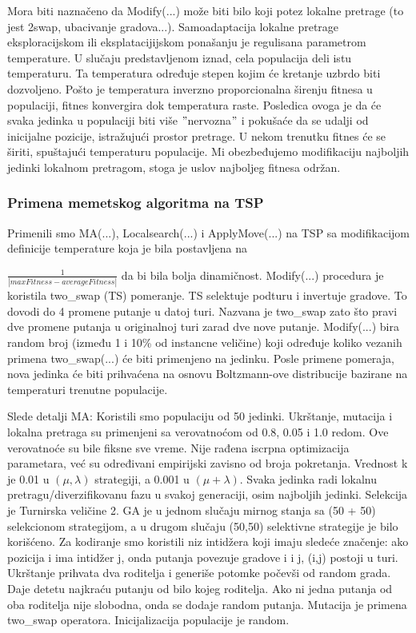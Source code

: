 \documentclass[a4paper]{article}
\begin{document}
Mora biti naznačeno da Modify(...) može biti bilo koji potez lokalne pretrage (to jest 2swap, ubacivanje gradova...). Samoadaptacija lokalne pretrage eksploracijskom ili eksplatacijijskom ponašanju je regulisana parametrom temperature. U slučaju predstavljenom iznad, cela populacija deli istu temperaturu. Ta temperatura određuje stepen kojim će kretanje uzbrdo biti dozvoljeno. Pošto je temperatura inverzno proporcionalna širenju fitnesa u populaciji, fitnes konvergira dok temperatura raste. Posledica ovoga je da će svaka jedinka u populaciji biti više $"$nervozna$"$ i pokušaće da se udalji od inicijalne pozicije, istražujući prostor pretrage. U nekom trenutku fitnes će se širiti, spuštajući temperaturu populacije. Mi obezbeđujemo modifikaciju najboljih jedinki lokalnom pretragom, stoga je uslov najboljeg fitnesa održan.  

\subsubsection{Primena memetskog algoritma na TSP}
\label{subsec:primena}

Primenili smo MA(...), Localsearch(...) i ApplyMove(...) na TSP sa modifikacijom definicije temperature koja je bila postavljena na 

$\frac{1}{|maxFitness - averageFitness|}$ da bi bila bolja dinamičnost. Modify(...) procedura je koristila two\_swap (TS) pomeranje. TS selektuje podturu i invertuje gradove. To dovodi do 4 promene putanje u datoj turi. Nazvana je two\_swap zato što pravi dve promene putanja u originalnoj turi zarad dve nove putanje. Modify(...) bira random broj (između 1 i 10\% od instancne veličine) koji određuje koliko vezanih primena two\_swap(...) će biti primenjeno na jedinku. Posle primene pomeraja, nova jedinka će biti prihvaćena na osnovu Boltzmann-ove distribucije bazirane na temperaturi trenutne populacije. 

Slede detalji MA:
Koristili smo populaciju od 50 jedinki. Ukrštanje, mutacija i lokalna pretraga su  primenjeni sa verovatnoćom od 0.8, 0.05 i 1.0 redom. Ove verovatnoće su bile fiksne sve vreme. Nije rađena iscrpna optimizacija parametara, već su određivani empirijski zavisno od broja pokretanja. Vrednost k je 0.01 u $(\mu,\lambda)$ strategiji, a 0.001 u $(\mu + \lambda)$. Svaka jedinka radi lokalnu pretragu/diverzifikovanu fazu u svakoj generaciji, osim najboljih jedinki. Selekcija je Turnirska veličine 2. GA je u jednom slučaju mirnog stanja sa (50 + 50) selekcionom strategijom, a u drugom slučaju (50,50) selektivne strategije je bilo korišćeno. Za kodiranje smo koristili niz intidžera koji imaju sledeće značenje: ako pozicija i ima intidžer j, onda putanja povezuje gradove i i j, (i,j) postoji u turi. Ukrštanje prihvata dva roditelja i generiše potomke počevši od random grada. Daje detetu najkraću putanju od bilo kojeg roditelja. Ako ni jedna putanja od oba roditelja nije slobodna, onda se dodaje random putanja. Mutacija je primena two\_swap operatora. Inicijalizacija populacije je random. 
\end{document}
